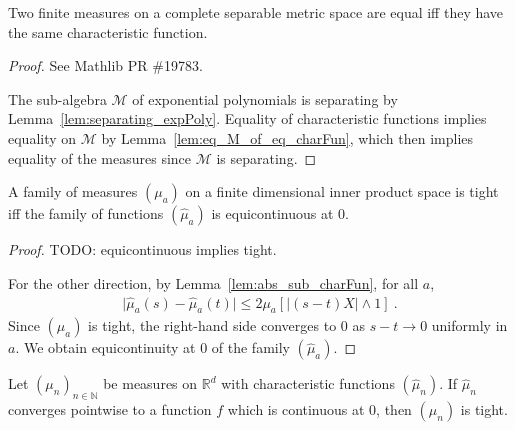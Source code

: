 \begin{lemma}\label{lem:ext_charFun}
\leanok
{}
Two finite measures on a complete separable metric space are equal iff they have the same characteristic function.
\end{lemma}

\begin{proof}
See Mathlib PR \#19783.

The sub-algebra $\mathcal M$ of exponential polynomials is separating by Lemma~\ref{lem:separating_expPoly}. Equality of characteristic functions implies equality on $\mathcal M$ by Lemma~\ref{lem:eq_M_of_eq_charFun}, which then implies equality of the measures since $\mathcal M$ is separating.
\end{proof}


\begin{lemma}\label{lem:tight_iff_charFun_equicontinuous}
\leanok
{}
A family of measures $(\mu_a)$ on a finite dimensional inner product space is tight iff the family of functions $(\hat{\mu}_a)$ is equicontinuous at 0.
\end{lemma}

\begin{proof}
TODO: equicontinuous implies tight.

For the other direction, by Lemma~\ref{lem:abs_sub_charFun}, for all $a$,
\begin{align*}
    \vert \hat{\mu}_a(s) - \hat{\mu}_a(t) \vert
    \le 2 \mu_a\left[ \left\vert (s - t) X\right\vert \wedge 1\right]
    \: .
\end{align*}
Since $(\mu_a)$ is tight, the right-hand side converges to 0 as $s - t \to 0$ uniformly in $a$.
We obtain equicontinuity at 0 of the family $(\hat{\mu}_a)$.
\end{proof}


\begin{lemma}\label{lem:tight_of_tendsto_charFun}
\leanok
{}
Let $(\mu_n)_{n \in \mathbb{N}}$ be measures on $\mathbb{R}^d$ with characteristic functions $(\hat{\mu}_n)$. If $\hat{\mu}_n$ converges pointwise to a function $f$ which is continuous at 0, then $(\mu_n)$ is tight.
\end{lemma}

